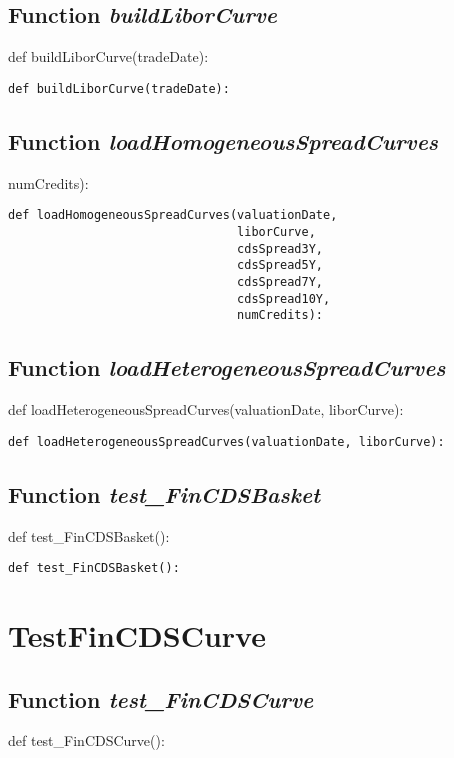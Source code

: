 \documentclass[twoside,11pt]{book}
\begin{document}
\subsection{Function {\it buildLiborCurve}}
def buildLiborCurve(tradeDate):

\begin{lstlisting}
def buildLiborCurve(tradeDate):
\end{lstlisting}

\subsection{Function {\it loadHomogeneousSpreadCurves}}
numCredits):

\begin{lstlisting}
def loadHomogeneousSpreadCurves(valuationDate,
                                liborCurve,
                                cdsSpread3Y,
                                cdsSpread5Y,
                                cdsSpread7Y,
                                cdsSpread10Y,
                                numCredits):
\end{lstlisting}

\subsection{Function {\it loadHeterogeneousSpreadCurves}}
def loadHeterogeneousSpreadCurves(valuationDate, liborCurve):

\begin{lstlisting}
def loadHeterogeneousSpreadCurves(valuationDate, liborCurve):
\end{lstlisting}

\subsection{Function {\it test\_FinCDSBasket}}
def test\_FinCDSBasket():

\begin{lstlisting}
def test_FinCDSBasket():
\end{lstlisting}


\newpage
\section{TestFinCDSCurve}

\subsection{Function {\it test\_FinCDSCurve}}
def test\_FinCDSCurve():
\end{document}

